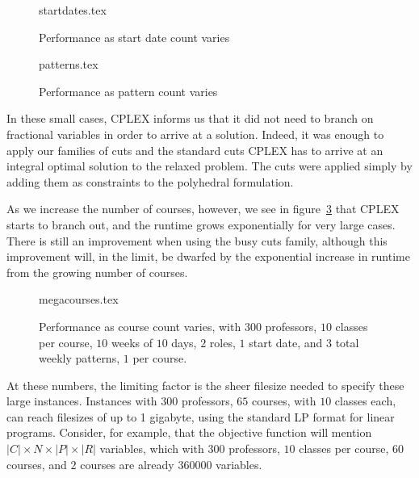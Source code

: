 \begin{figure}
\begin{center}
{startdates.tex}
\caption{Performance as start date count varies}
\label{bench:startdates}
\end{center}
\end{figure}

\begin{figure}
\begin{center}
{patterns.tex}
\caption{Performance as pattern count varies}
\label{bench:patterns}
\end{center}
\end{figure}

In these small cases, CPLEX informs us that it did not need to branch on fractional variables in order to arrive at a solution. Indeed, it was enough to apply our families of cuts and the standard cuts CPLEX has to arrive at an integral optimal solution to the relaxed problem. The cuts were applied simply by adding them as constraints to the polyhedral formulation.

As we increase the number of courses, however, we see in figure~\ref{bench:megacourses} that CPLEX starts to branch out, and the runtime grows exponentially for very large cases. There is still an improvement when using the busy cuts family, although this improvement will, in the limit, be dwarfed by the exponential increase in runtime from the growing number of courses.

\begin{figure}
  \begin{center}
    {megacourses.tex}
    \caption{Performance as course count varies, with $300$ professors, $10$ classes per course, $10$ weeks of $10$ days, $2$ roles, $1$ start date, and $3$ total weekly patterns, $1$ per course.}
    \label{bench:megacourses}
  \end{center}
\end{figure}

At these numbers, the limiting factor is the sheer filesize needed to specify these large instances. Instances with $300$ professors, $65$ courses, with $10$ classes each, can reach filesizes of up to 1 gigabyte, using the standard LP format for linear programs. Consider, for example, that the objective function will mention $|C| \times N \times |P| \times |R|$ variables, which with $300$ professors, $10$ classes per course, $60$ courses, and $2$ courses are already $360000$ variables.

